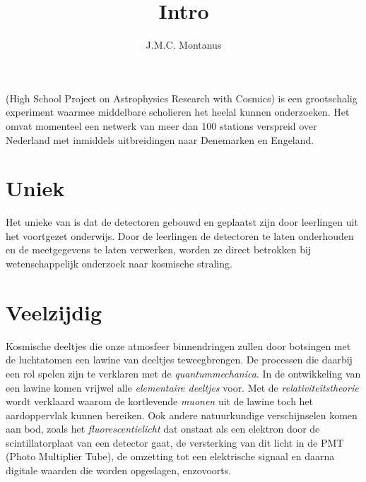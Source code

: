 

\title{Intro}
\author{J.M.C. Montanus}



\maketitle

\section{\hisparc}

\hisparc (High School Project on Astrophysics Research with Cosmics) is
een grootschalig experiment waarmee middelbare scholieren het heelal
kunnen onderzoeken. Het omvat momenteel een netwerk van meer dan 100
stations verspreid over Nederland met inmiddels uitbreidingen naar
Denemarken en Engeland. 


\section{Uniek}

Het unieke van \hisparc is dat de detectoren gebouwd en geplaatst zijn
door leerlingen uit het voortgezet onderwijs. Door de leerlingen de detectoren te laten onderhouden en de
meetgegevens te laten verwerken, worden ze direct betrokken bij
wetenschappelijk onderzoek naar kosmische straling. 


\section{Veelzijdig}

Kosmische deeltjes die onze atmosfeer binnendringen zullen door
botsingen met de luchtatomen een lawine van deeltjes teweegbrengen. De
processen die daarbij een rol spelen zijn te verklaren met de
\emph{quantummechanica}. In de ontwikkeling van een lawine komen vrijwel
alle \emph{elementaire deeltjes} voor. Met de
\emph{relativiteitstheorie} wordt verklaard waarom de kortlevende
\emph{muonen} uit de lawine toch het aardoppervlak kunnen bereiken. Ook
andere natuurkundige verschijnselen komen aan bod, zoals het
\emph{fluorescentielicht} dat onstaat als een elektron door de
scintillatorplaat van een \hisparc detector gaat, de versterking van dit
licht in de PMT (Photo Multiplier Tube), de omzetting tot een
elektrische signaal en daarna digitale waarden die worden opgeslagen,
enzovoorts.      


